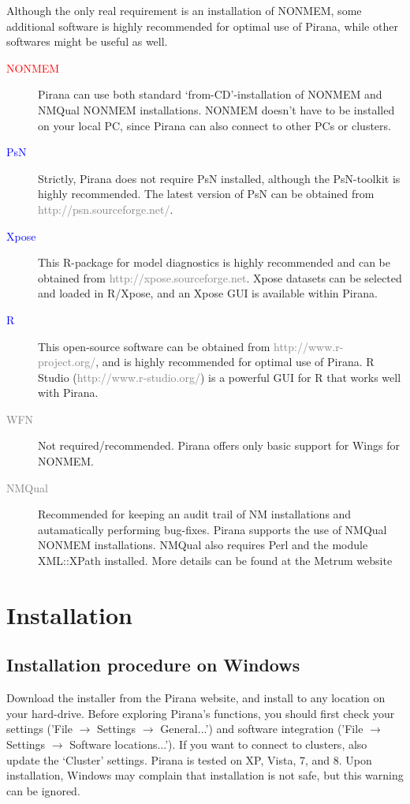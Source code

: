 Although the only real requirement is an installation of NONMEM, some additional software is highly recommended for optimal use of Pirana, while other softwares might be useful as well.

\begin{description}
\item[\textcolor{Red}{NONMEM}] Pirana can use both standard
  `from-CD'-installation of NONMEM and NMQual NONMEM
  installations. NONMEM doesn't have to be installed on your local PC,
  since Pirana can also connect to other PCs or clusters.

\item[\textcolor{Blue}{PsN}] Strictly, Pirana does not require PsN
  installed, although the PsN-toolkit is highly recommended. The latest
  version of PsN can be obtained from \textcolor{Grey}{http://psn.sourceforge.net/}.

\item[\textcolor{Blue}{Xpose}] This R-package for model diagnostics is
  highly recommended and can be obtained from
  \textcolor{Grey}{http://xpose.sourceforge.net}. Xpose datasets can
  be selected and loaded in R/Xpose, and an Xpose GUI is available
  within Pirana.

\item[\textcolor{Blue}{R}] This open-source software can be
obtained from \textcolor{Grey}{http://www.r-project.org/}, and is highly
recommended for optimal use of Pirana. R Studio
(\textcolor{Grey}{http://www.r-studio.org/}) is a powerful GUI for
R that works well with Pirana.

\item[\textcolor{Grey}{WFN}] Not required/recommended. Pirana offers only basic
  support for Wings for NONMEM.

\item[\textcolor{Grey}{NMQual}] Recommended for keeping an audit trail of NM
  installations and autamatically performing bug-fixes. Pirana
  supports the use of NMQual NONMEM installations. NMQual also
  requires Perl and the module XML::XPath installed. More details can
  be found at the Metrum website
\end{description}

\section{Installation}

\subsection{Installation procedure on Windows} Download the installer
from the Pirana website, and install to any location on your hard-drive. Before exploring
Pirana's functions, you should first check your settings ('File
$\rightarrow$ Settings $\rightarrow$ General...') and software
integration ('File $\rightarrow$ Settings $\rightarrow$ Software
locations...'). If you want to connect to clusters, also update the
`Cluster' settings.  Pirana is tested on XP, Vista, 7, and 8. Upon installation,
Windows may complain that installation is not safe, but this warning can be ignored.

